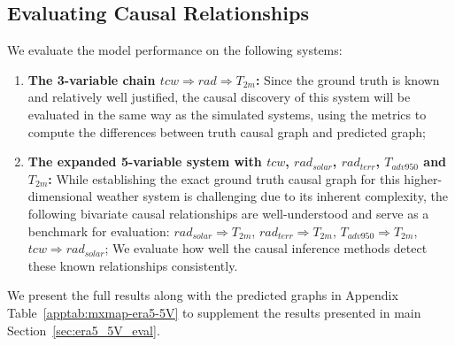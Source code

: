 \subsection{Evaluating Causal Relationships}
\label{appsec:era5_eval}
We evaluate the model performance on the following systems:
\begin{enumerate}
    \item \textbf{The 3-variable chain $tcw \Rightarrow rad \Rightarrow  T_{2m}$:} Since the ground truth is known and relatively well justified, the causal discovery of this system will be evaluated in the same way as the simulated systems, using the metrics to compute the differences between truth causal graph and predicted graph;
    \item \textbf{The expanded 5-variable system with $tcw$, $rad_{solar}$, $rad_{terr}$, $T_{adv950}$ and $T_{2m}$:} While establishing the exact ground truth causal graph for this higher-dimensional weather system is challenging due to its inherent complexity, the following bivariate causal relationships are well-understood and serve as a benchmark for evaluation: $rad_{solar} \Rightarrow T_{2m}$, $rad_{terr} \Rightarrow T_{2m}$, $T_{adv950} \Rightarrow T_{2m}$, $tcw\Rightarrow rad_{solar}$; We evaluate how well the causal inference methods detect these known relationships consistently. 
\end{enumerate}

We present the full results along with the predicted graphs in Appendix Table~\ref{apptab:mxmap-era5-5V} to supplement the results presented in main Section~\ref{sec:era5_5V_eval}.

